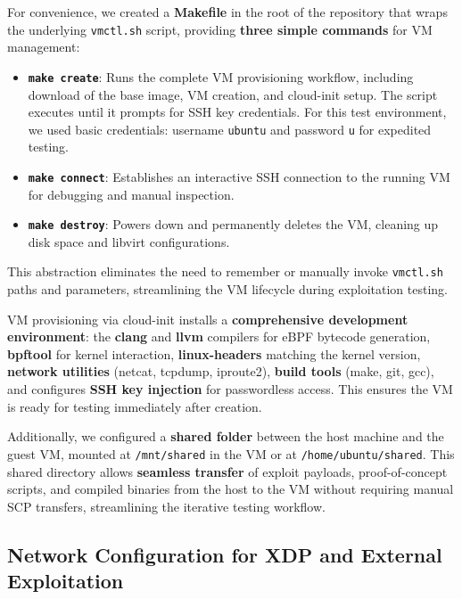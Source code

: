 \vspace{0.3cm}
\noindent
For convenience, we created a \textbf{Makefile} in the root of the repository that wraps the underlying \texttt{vmctl.sh} script, providing \textbf{three simple commands} for VM management:

\begin{itemize}
  \item \textbf{\texttt{make create}}: Runs the complete VM provisioning workflow, including download of the base image, VM creation, and cloud-init setup. The script executes until it prompts for SSH key credentials. For this test environment, we used basic credentials: username \texttt{ubuntu} and password \texttt{u} for expedited testing.
  \item \textbf{\texttt{make connect}}: Establishes an interactive SSH connection to the running VM for debugging and manual inspection.
  \item \textbf{\texttt{make destroy}}: Powers down and permanently deletes the VM, cleaning up disk space and libvirt configurations.
\end{itemize}

\vspace{0.3cm}
\noindent
This abstraction eliminates the need to remember or manually invoke \texttt{vmctl.sh} paths and parameters, streamlining the VM lifecycle during exploitation testing.

\noindent
VM provisioning via cloud-init installs a \textbf{comprehensive development environment}: the \textbf{clang} and \textbf{llvm} compilers for eBPF bytecode generation, \textbf{bpftool} for kernel interaction, \textbf{linux-headers} matching the kernel version, \textbf{network utilities} (netcat, tcpdump, iproute2), \textbf{build tools} (make, git, gcc), and configures \textbf{SSH key injection} for passwordless access. This ensures the VM is ready for testing immediately after creation.

\vspace{0.3cm}
\noindent
Additionally, we configured a \textbf{shared folder} between the host machine and the guest VM, mounted at \texttt{/mnt/shared} in the VM or at \texttt{/home/ubuntu/shared}. This shared directory allows \textbf{seamless transfer} of exploit payloads, proof-of-concept scripts, and compiled binaries from the host to the VM without requiring manual SCP transfers, streamlining the iterative testing workflow.

\subsection{Network Configuration for XDP and External Exploitation}

